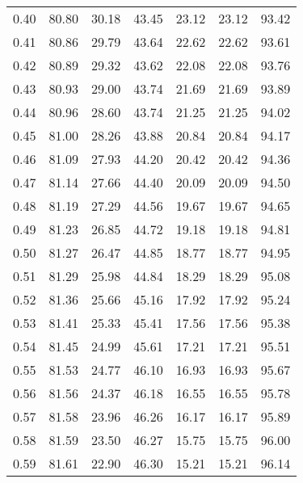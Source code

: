 \begin{tabular}{|c|c|c|c|c|c|c|}
      0.40 &     80.80 &     30.18 &      43.45 &   23.12 &      23.12 &         93.42 \\
      0.41 &     80.86 &     29.79 &      43.64 &   22.62 &      22.62 &         93.61 \\
      0.42 &     80.89 &     29.32 &      43.62 &   22.08 &      22.08 &         93.76 \\
      0.43 &     80.93 &     29.00 &      43.74 &   21.69 &      21.69 &         93.89 \\
      0.44 &     80.96 &     28.60 &      43.74 &   21.25 &      21.25 &         94.02 \\
      0.45 &     81.00 &     28.26 &      43.88 &   20.84 &      20.84 &         94.17 \\
      0.46 &     81.09 &     27.93 &      44.20 &   20.42 &      20.42 &         94.36 \\
      0.47 &     81.14 &     27.66 &      44.40 &   20.09 &      20.09 &         94.50 \\
      0.48 &     81.19 &     27.29 &      44.56 &   19.67 &      19.67 &         94.65 \\
      0.49 &     81.23 &     26.85 &      44.72 &   19.18 &      19.18 &         94.81 \\
      0.50 &     81.27 &     26.47 &      44.85 &   18.77 &      18.77 &         94.95 \\
      0.51 &     81.29 &     25.98 &      44.84 &   18.29 &      18.29 &         95.08 \\
      0.52 &     81.36 &     25.66 &      45.16 &   17.92 &      17.92 &         95.24 \\
      0.53 &     81.41 &     25.33 &      45.41 &   17.56 &      17.56 &         95.38 \\
      0.54 &     81.45 &     24.99 &      45.61 &   17.21 &      17.21 &         95.51 \\
      0.55 &     81.53 &     24.77 &      46.10 &   16.93 &      16.93 &         95.67 \\
      0.56 &     81.56 &     24.37 &      46.18 &   16.55 &      16.55 &         95.78 \\
      0.57 &     81.58 &     23.96 &      46.26 &   16.17 &      16.17 &         95.89 \\
      0.58 &     81.59 &     23.50 &      46.27 &   15.75 &      15.75 &         96.00 \\
      0.59 &     81.61 &     22.90 &      46.30 &   15.21 &      15.21 &         96.14 \\

\end{tabular}
